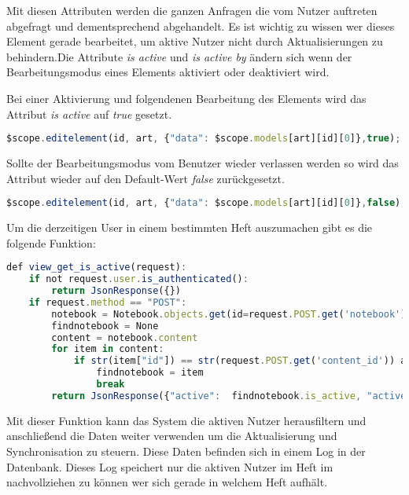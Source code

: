 Mit diesen Attributen werden die ganzen Anfragen die vom Nutzer auftreten abgefragt und dementsprechend abgehandelt. Es ist wichtig zu wissen wer dieses Element gerade bearbeitet, um aktive Nutzer nicht durch Aktualisierungen zu behindern.Die Attribute \textit{is active} und \textit{is active by} ändern sich wenn der Bearbeitungsmodus eines Elements aktiviert oder deaktiviert wird.

Bei einer Aktivierung und folgendenen Bearbeitung des Elements wird das Attribut \textit{is active} auf \textit{true} gesetzt.
\begin{lstlisting}[caption={Bearbeitungsmodus true - PWS}, language=Javascript]
$scope.editelement(id, art, {"data": $scope.models[art][id][0]},true);
\end{lstlisting}

Sollte der Bearbeitungsmodus vom Benutzer wieder verlassen werden so wird das Attribut wieder auf den Default-Wert \textit{false} zurückgesetzt.
\begin{lstlisting}[caption={Bearbeitungsmodus false - PWS}, language=Javascript]
$scope.editelement(id, art, {"data": $scope.models[art][id][0]},false);
\end{lstlisting}

Um die derzeitigen User in einem bestimmten Heft auszumachen gibt es die folgende Funktion:
\begin{lstlisting}[caption={Abfrage der aktiven Nutzer - PWS}, language=Javascript]
def view_get_is_active(request):
    if not request.user.is_authenticated():
        return JsonResponse({})
    if request.method == "POST":
        notebook = Notebook.objects.get(id=request.POST.get('notebook'))
        findnotebook = None
        content = notebook.content
        for item in content:
            if str(item["id"]) == str(request.POST.get('content_id')) and item["art"] == request.POST.get('content_art'):
                findnotebook = item
                break
        return JsonResponse({"active":  findnotebook.is_active, "active_by": findnotebook.is_active_by})
\end{lstlisting}
Mit dieser Funktion kann das System die aktiven Nutzer herausfiltern und anschließend die Daten weiter verwenden um die Aktualisierung und Synchronisation zu steuern. Diese Daten befinden sich in einem Log in der Datenbank. Dieses Log speichert nur die aktiven Nutzer im Heft im nachvollziehen zu können wer sich gerade in welchem Heft aufhält.

